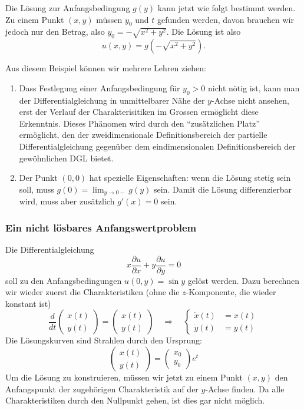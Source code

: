 Die Lösung zur Anfangsbedingung $g(y)$ kann jetzt wie folgt bestimmt werden.
Zu einem Punkt $(x,y)$ müssen $y_0$ und $t$ gefunden werden, davon brauchen wir
jedoch nur den Betrag, also $y_0=-\sqrt{x^2+y^2}$. Die Lösung ist also
\[
u(x,y)=g(-\sqrt{x^2+y^2}).
\]

Aus diesem Beispiel können wir mehrere Lehren ziehen: 
\begin{enumerate}
\item Dass Festlegung einer Anfangsbedingung für $y_0>0$ nicht nötig ist,
kann man der Differentialgleichung in unmittelbarer Nähe der $y$-Achse nicht
ansehen, erst der Verlauf der Charakterisitiken im Grossen ermöglicht
diese Erkenntnis. Dieses Phänomen wird durch den ``zusätzlichen Platz''
ermöglicht, den der zweidimensionale Definitionsbereich der partielle Differentialgleichung gegenüber dem
eindimensionalen Definitionsbereich der gewöhnlichen DGL bietet.
\item Der Punkt $(0,0)$ hat spezielle Eigenschaften: wenn die Lösung stetig
sein soll, muss $g(0)=\lim_{y\to 0-} g(y)$ sein. Damit die Lösung differenzierbar
wird, muss aber zusätzlich $g'(x)=0$ sein.
\end{enumerate}

\subsubsection{Ein nicht lösbares Anfangswertproblem\label{unloesbar}}
Die Differentialgleichung
\[
x\frac{\partial u}{\partial x}
+
y\frac{\partial u}{\partial y}
=0
\]
soll zu den Anfangsbedingungen $u(0,y)=\sin y$ gelöst werden.
Dazu berechnen wir wieder zuerst die Charakteristiken (ohne die 
$z$-Komponente, die wieder konstant ist)
\[
\frac{d}{dt}
\begin{pmatrix}
x(t)\\y(t)
\end{pmatrix}
=
\begin{pmatrix}
x(t)\\y(t)
\end{pmatrix}
\quad
\Rightarrow
\quad
\left\{
\begin{aligned}
\dot x(t)&=x(t)\\
\dot y(t)&=y(t)
\end{aligned}
\right.
\]
Die Lösungskurven sind Strahlen durch den Ursprung:
\[
\begin{pmatrix}
x(t)\\y(t)
\end{pmatrix}
=\begin{pmatrix}x_0\\y_0\end{pmatrix}e^t
\]
Um die Lösung zu konstruieren, müssen wir jetzt zu einem Punkt
$(x,y)$ den Anfangspunkt der zugehörigen Charakteristik auf der $y$-Achse
finden. Da alle Charakteristiken durch den Nullpunkt gehen, ist dies 
gar nicht möglich. 


